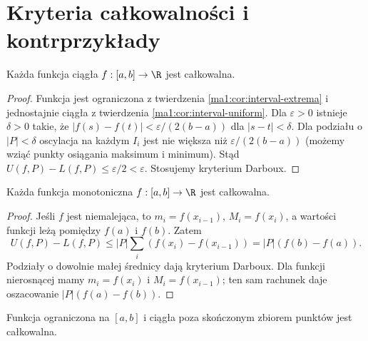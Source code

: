 \section{Kryteria całkowalności i kontrprzykłady}
\begin{twierdzenie}
\label{ma1:thm:riemann-continuous}
Każda funkcja ciągła $f:[a,b]\to\R$ jest całkowalna.
\end{twierdzenie}
\begin{proof}
Funkcja jest ograniczona z twierdzenia \ref{ma1:cor:interval-extrema} i jednostajnie ciągła z twierdzenia \ref{ma1:cor:interval-uniform}. Dla $\varepsilon>0$ istnieje $\delta>0$ takie, że $|f(s)-f(t)|<\varepsilon/(2(b-a))$ dla $|s-t|<\delta$. Dla podziału o $|P|<\delta$ oscylacja na każdym $I_i$ jest nie większa niż $\varepsilon/(2(b-a))$ (możemy wziąć punkty osiągania maksimum i minimum). Stąd $U(f,P)-L(f,P)\le\varepsilon/2<\varepsilon$. Stosujemy kryterium Darboux.
\end{proof}
\begin{twierdzenie}
\label{ma1:thm:riemann-monotone}
Każda funkcja monotoniczna $f:[a,b]\to\R$ jest całkowalna.
\end{twierdzenie}
\begin{proof}
Jeśli $f$ jest niemalejąca, to $m_i=f(x_{i-1})$, $M_i=f(x_i)$, a wartości funkcji leżą pomiędzy $f(a)$ i $f(b)$. Zatem
\[
 U(f,P)-L(f,P)\le |P|\sum_i(f(x_i)-f(x_{i-1}))
 =|P|(f(b)-f(a)).
\]
Podziały o dowolnie małej średnicy dają kryterium Darboux. Dla funkcji nierosnącej mamy $m_i=f(x_i)$ i $M_i=f(x_{i-1})$; ten sam rachunek daje oszacowanie $|P|(f(a)-f(b))$.
\end{proof}
\begin{twierdzenie}
\label{ma1:thm:riemann-finite-discontinuities}
Funkcja ograniczona na $[a,b]$ i ciągła poza skończonym zbiorem punktów jest całkowalna.
\end{twierdzenie}
